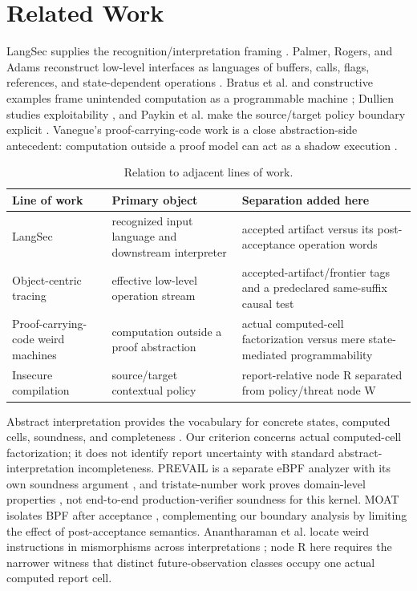 \documentclass[conference]{IEEEtran}
\begin{document}
\section{Related Work}

LangSec supplies the recognition/interpretation framing \cite{ref1,ref2,ref3,ref4}. Palmer, Rogers, and Adams reconstruct low-level interfaces as languages of buffers, calls, flags, references, and state-dependent operations \cite{ref10}. Bratus et al. and constructive examples frame unintended computation as a programmable machine \cite{ref11,ref12,ref13}; Dullien studies exploitability \cite{ref14}, and Paykin et al. make the source/target policy boundary explicit \cite{ref15}. Vanegue's proof-carrying-code work is a close abstraction-side antecedent: computation outside a proof model can act as a shadow execution \cite{ref16}.

\begin{table}[t]
\caption{Relation to adjacent lines of work.}
\label{tab:related-work}
\centering
\begin{tabularx}{\textwidth}{@{}p{}p{}Y@{}}
\toprule
Line of work & Primary object & Separation added here \\
\midrule
LangSec \cite{ref1,ref2,ref3,ref4} & recognized input language and downstream interpreter & accepted artifact versus its post-acceptance operation words \\
Object-centric tracing \cite{ref10} & effective low-level operation stream & accepted-artifact/frontier tags and a predeclared same-suffix causal test \\
Proof-carrying-code weird machines \cite{ref16} & computation outside a proof abstraction & actual computed-cell factorization versus mere state-mediated programmability \\
Insecure compilation \cite{ref15} & source/target contextual policy & report-relative node R separated from policy/threat node W \\
\bottomrule
\end{tabularx}
\end{table}

Abstract interpretation provides the vocabulary for concrete states, computed cells, soundness, and completeness \cite{ref5,ref17}. Our criterion concerns actual computed-cell factorization; it does not identify report uncertainty with standard abstract-interpretation incompleteness. PREVAIL is a separate eBPF analyzer with its own soundness argument \cite{ref18}, and tristate-number work proves domain-level properties \cite{ref19}, not end-to-end production-verifier soundness for this kernel. MOAT isolates BPF after acceptance \cite{ref20}, complementing our boundary analysis by limiting the effect of post-acceptance semantics. Anantharaman et al. locate weird instructions in mismorphisms across interpretations \cite{ref21}; node R here requires the narrower witness that distinct future-observation classes occupy one actual computed report cell.
\end{document}
